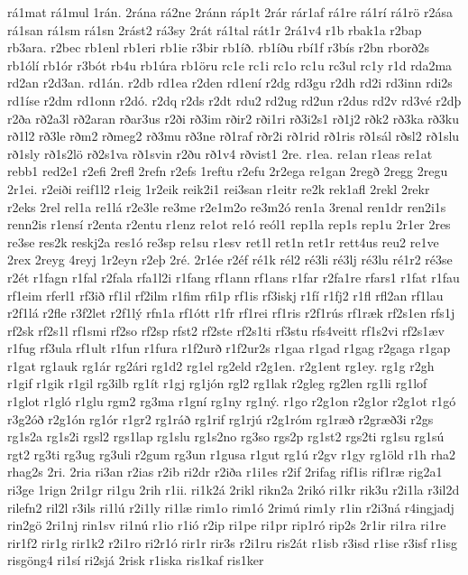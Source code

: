 {rá1mat
rá1mul
1rán.
2rána
rá2ne
2ránn
ráp1t
2rár
rár1af
rá1re
rá1rí
rá1rö
r2ása
rá1san
rá1sm
rá1sn
2rást2
rá3sy
2rát
rá1tal
rát1r
2rá1v4
r1b
rbak1a
r2bap
rb3ara.
r2bec
rb1enl
rb1eri
rb1ie
r3bir
rb1íð.
rb1íðu
rbí1f
r3bís
r2bn
rborð2s
rb1ólí
rb1ór
r3bót
rb4u
rb1úra
rb1öru
rc1e
rc1i
rc1o
rc1u
rc3ul
rc1y
r1d
rda2ma
rd2an
r2d3an.
rd1án.
r2db
rd1ea
r2den
rd1ení
r2dg
rd3gu
r2dh
rd2i
rd3inn
rdi2s
rd1íse
r2dm
rd1onn
r2dó.
r2dq
r2ds
r2dt
rdu2
rd2ug
rd2un
r2dus
rd2v
rd3vé
r2dþ
r2ða
rð2a3l
rð2aran
rðar3us
r2ði
rð3im
rðir2
rði1ri
rð3i2s1
rð1j2
rðk2
rð3ka
rð3ku
rð1l2
rð3le
rðm2
rðmeg2
rð3mu
rð3ne
rð1raf
rðr2i
rð1rid
rð1ris
rð1sál
rðsl2
rð1slu
rð1sly
rð1s2lö
rð2s1va
rð1svin
r2ðu
rð1v4
rðvist1
2re.
r1ea.
re1an
r1eas
re1at
rebb1
red2e1
r2efi
2refl
2refn
r2efs
1reftu
r2efu
2r2ega
re1gan
2regð
2regg
2regu
2r1ei.
r2eiði
reif1l2
r1eig
1r2eik
reik2i1
rei3san
r1eitr
re2k
rek1afl
2rekl
2rekr
r2eks
2rel
rel1a
re1lá
r2e3le
re3me
r2e1m2o
re3m2ó
ren1a
3renal
ren1dr
ren2i1s
renn2is
r1ensí
r2enta
r2entu
r1enz
re1ot
re1ó
reól1
rep1la
rep1s
rep1u
2r1er
2res
re3se
res2k
reskj2a
res1ó
re3sp
re1su
r1esv
ret1l
ret1n
ret1r
rett4us
reu2
re1ve
2rex
2reyg
4reyj
1r2eyn
r2eþ
2ré.
2r1ée
r2éf
ré1k
rél2
ré3li
ré3lj
ré3lu
ré1r2
ré3se
r2ét
r1fagn
r1fal
r2fala
rfa1l2i
r1fang
rf1ann
rf1ans
r1far
r2fa1re
rfars1
r1fat
r1fau
rf1eim
rferl1
rf3ið
rf1il
rf2ilm
r1fim
rfi1p
rf1is
rf3iskj
r1fí
r1fj2
r1fl
rfl2an
rf1lau
r2f1lá
r2fle
r3f2let
r2f1lý
rfn1a
rf1ótt
r1fr
rf1rei
rf1ris
r2f1rús
rf1ræk
rf2s1en
rfs1j
rf2sk
rf2s1l
rf1smi
rf2so
rf2sp
rfst2
rf2ste
rf2s1ti
rf3stu
rfs4veitt
rf1s2vi
rf2s1æv
r1fug
rf3ula
rf1ult
r1fun
r1fura
r1f2urð
r1f2ur2s
r1gaa
r1gad
r1gag
r2gaga
r1gap
r1gat
rg1auk
rg1ár
rg2ári
rg1d2
rg1el
rg2eld
r2g1en.
r2g1ent
rg1ey.
rg1g
r2gh
r1gif
r1gik
r1gil
rg3ilb
rg1ít
r1gj
rg1jón
rgl2
rg1lak
r2gleg
rg2len
rg1li
rg1lof
r1glot
r1gló
r1glu
rgm2
rg3ma
r1gní
rg1ny
rg1ný.
r1go
r2g1on
r2g1or
r2g1ot
r1gó
r3g2óð
r2g1ón
rg1ór
r1gr2
rg1ráð
rg1rif
rg1rjú
r2g1róm
rg1ræð
r2græð3i
r2gs
rg1s2a
rg1s2i
rgsl2
rgs1lap
rg1slu
rg1s2no
rg3so
rgs2p
rg1st2
rgs2ti
rg1su
rg1sú
rgt2
rg3ti
rg3ug
rg3uli
r2gum
rg3un
r1gusa
r1gut
rg1ú
r2gv
r1gy
rg1öld
r1h
rha2
rhag2s
2ri.
2ria
ri3an
r2ias
r2ib
ri2dr
r2iða
r1i1es
r2if
2rifag
rif1is
rif1ræ
rig2a1
ri3ge
1rign
2ri1gr
ri1gu
2rih
r1ii.
ri1k2á
2rikl
rikn2a
2rikó
ri1kr
rik3u
r2i1la
r3il2d
rilefn2
ril2l
r3ils
ri1lú
r2i1ly
ri1læ
rim1o
rim1ó
2rimú
rim1y
r1in
r2i3ná
r4ingjadj
rin2gö
2ri1nj
rin1sv
ri1nú
r1io
r1ió
r2ip
ri1pe
ri1pr
rip1ró
rip2s
2r1ir
ri1ra
ri1re
rir1f2
rir1g
rir1k2
r2i1ro
ri2r1ó
rir1r
rir3s
r2i1ru
ris2át
r1isb
r3isd
r1ise
r3isf
r1isg
risgöng4
ri1sí
ri2sjá
2risk
r1iska
ris1kaf
ris1ker
}
